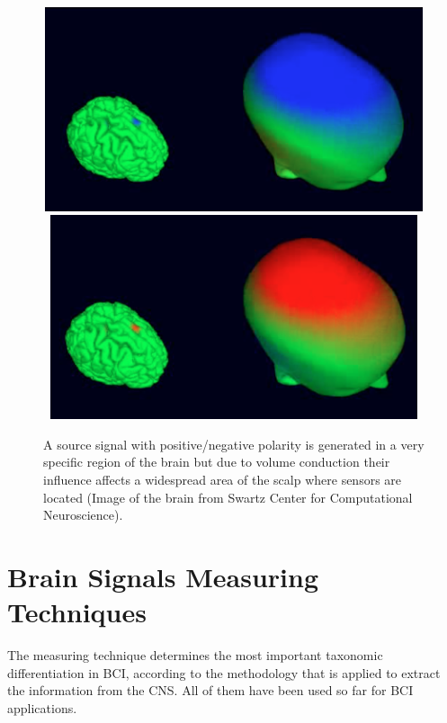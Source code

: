 \begin{figure}[]
\centering
\includegraphics[height=6cm,width=14cm]{images/volconduction1.png}
\includegraphics[height=6cm,width=14cm]{images/volconduction2.png}
\caption[EEG Volume Conduction]{A source signal with positive/negative polarity is generated in a very specific region of the brain but due to volume conduction their influence affects a widespread area of the scalp where sensors are located (Image of the brain from Swartz Center for Computational Neuroscience).}
\label{fig:volconduction}
\end{figure}

\section{Brain Signals Measuring Techniques}

The measuring technique determines the most important taxonomic differentiation in BCI, according to the methodology that is applied to extract the information from the CNS.  All of them have been used so far for BCI applications.

